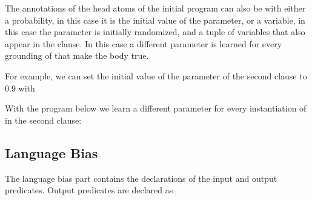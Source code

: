 \documentclass[letterpaper,10pt,english]{sphinxmanual}
\begin{document}
The annotations of the head atoms of the initial program can also be  with  either a probability, in this case it is the initial value of the parameter, or a variable, in this case the parameter is initially randomized, and  a tuple of variables that also appear in the clause.
In this case a different parameter is learned for every grounding of  that make the body true.

For example, we can set the initial value of the parameter of the second clause to 0.9 with

\begin{sphinxVerbatim}[commandchars=\\\{\}]
\PYG{p}{[} 
         
        \PYG{p}{]}
\end{sphinxVerbatim}

With the program below we learn a different parameter for every instantiation of  in the second clause:

\begin{sphinxVerbatim}[commandchars=\\\{\}]
\PYG{p}{[} 
         
        \PYG{p}{]}
\end{sphinxVerbatim}


\subsection{Language Bias}
\label{\detokenize{index:language-bias}}
The language bias part contains the declarations of the input and output predicates.
Output predicates are declared as
\end{document}
